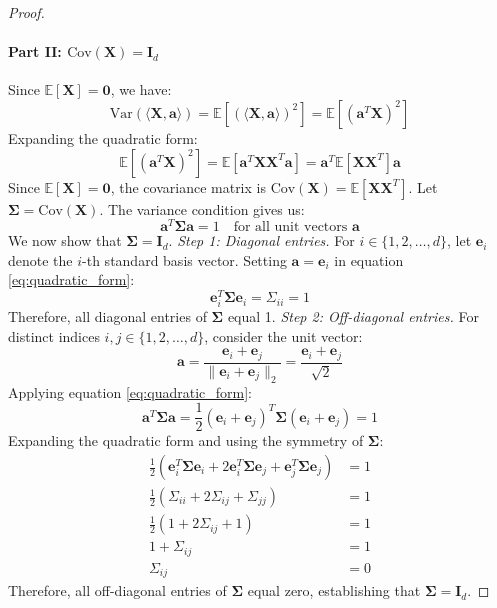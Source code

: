 \begin{proof}
\paragraph{Part II: $\mathrm{Cov}(\mathbf{X}) = \mathbf{I}_d$}
Since $\mathbb{E}[\mathbf{X}] = \mathbf{0}$, we have:
\begin{equation}
\mathrm{Var}(\langle \mathbf{X}, \mathbf{a} \rangle) = \mathbb{E}[(\langle \mathbf{X}, \mathbf{a} \rangle)^2] = \mathbb{E}[(\mathbf{a}^T \mathbf{X})^2]
\end{equation}
Expanding the quadratic form:
\begin{equation}
\mathbb{E}[(\mathbf{a}^T \mathbf{X})^2] = \mathbb{E}[\mathbf{a}^T \mathbf{X} \mathbf{X}^T \mathbf{a}] = \mathbf{a}^T \mathbb{E}[\mathbf{X} \mathbf{X}^T] \mathbf{a}
\end{equation}
Since $\mathbb{E}[\mathbf{X}] = \mathbf{0}$, the covariance matrix is $\mathrm{Cov}(\mathbf{X}) = \mathbb{E}[\mathbf{X} \mathbf{X}^T]$. Let $\boldsymbol{\Sigma} = \mathrm{Cov}(\mathbf{X})$. The variance condition gives us:
\begin{equation}\label{eq:quadratic_form}
\mathbf{a}^T \boldsymbol{\Sigma} \mathbf{a} = 1 \quad \text{for all unit vectors } \mathbf{a}
\end{equation}
We now show that $\boldsymbol{\Sigma} = \mathbf{I}_d$.
\emph{Step 1: Diagonal entries.} For $i \in \{1, 2, \ldots, d\}$, let $\mathbf{e}_i$ denote the $i$-th standard basis vector. Setting $\mathbf{a} = \mathbf{e}_i$ in equation \eqref{eq:quadratic_form}:
\begin{equation}
\mathbf{e}_i^T \boldsymbol{\Sigma} \mathbf{e}_i = \Sigma_{ii} = 1
\end{equation}
Therefore, all diagonal entries of $\boldsymbol{\Sigma}$ equal 1.
\emph{Step 2: Off-diagonal entries.} For distinct indices $i, j \in \{1, 2, \ldots, d\}$, consider the unit vector:
\begin{equation}
\mathbf{a} = \frac{\mathbf{e}_i + \mathbf{e}_j}{\|\mathbf{e}_i + \mathbf{e}_j\|_2} = \frac{\mathbf{e}_i + \mathbf{e}_j}{\sqrt{2}}
\end{equation}
Applying equation \eqref{eq:quadratic_form}:
\begin{equation}
\mathbf{a}^T \boldsymbol{\Sigma} \mathbf{a} = \frac{1}{2}(\mathbf{e}_i + \mathbf{e}_j)^T \boldsymbol{\Sigma} (\mathbf{e}_i + \mathbf{e}_j) = 1
\end{equation}
Expanding the quadratic form and using the symmetry of $\boldsymbol{\Sigma}$:
\begin{align}
\frac{1}{2}(\mathbf{e}_i^T \boldsymbol{\Sigma} \mathbf{e}_i + 2\mathbf{e}_i^T \boldsymbol{\Sigma} \mathbf{e}_j + \mathbf{e}_j^T \boldsymbol{\Sigma} \mathbf{e}_j) &= 1\\
\frac{1}{2}(\Sigma_{ii} + 2\Sigma_{ij} + \Sigma_{jj}) &= 1\\
\frac{1}{2}(1 + 2\Sigma_{ij} + 1) &= 1\\
1 + \Sigma_{ij} &= 1\\
\Sigma_{ij} &= 0
\end{align}
Therefore, all off-diagonal entries of $\boldsymbol{\Sigma}$ equal zero, establishing that $\boldsymbol{\Sigma} = \mathbf{I}_d$.
\end{proof}


